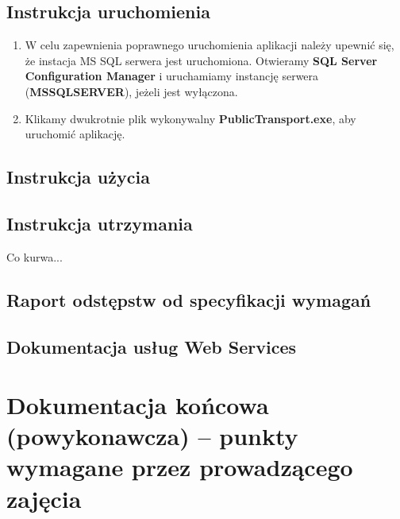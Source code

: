 \documentclass[10pt,a4paper]{article}
\begin{document}
\subsection{Instrukcja uruchomienia}
\begin{enumerate}
	\item W celu zapewnienia poprawnego uruchomienia aplikacji należy upewnić się, że instacja MS SQL serwera jest uruchomiona. Otwieramy \textbf{SQL Server Configuration Manager} i uruchamiamy instancję serwera (\textbf{MSSQLSERVER}), jeżeli jest wyłączona.
	\item Klikamy dwukrotnie plik wykonywalny \textbf{PublicTransport.exe}, aby uruchomić aplikację.
\end{enumerate}
% 

\subsection{Instrukcja użycia}
%

\subsection{Instrukcja utrzymania}
Co kurwa...
%

\subsection{Raport odstępstw od specyfikacji wymagań}

\subsection{Dokumentacja usług Web Services}
%

\section{Dokumentacja końcowa (powykonawcza) -- punkty wymagane przez prowadzącego zajęcia}
\end{document}
